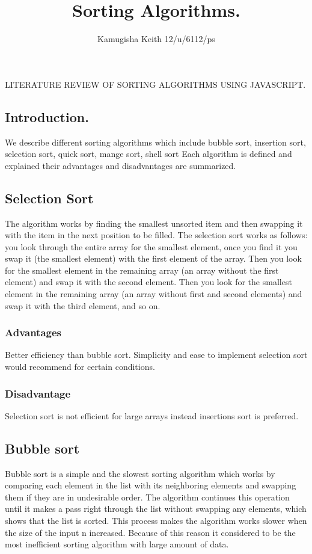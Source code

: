 \documentclass{article}
\title{Sorting Algorithms.}
\author{Kamugisha Keith 12/u/6112/ps}
\begin{document}
LITERATURE REVIEW OF SORTING ALGORITHMS USING JAVASCRIPT. 
\subsection{Introduction.}
	We describe different sorting algorithms which include bubble sort, insertion sort, selection sort, quick sort, mange sort, shell sort  Each algorithm is defined and explained their advantages and disadvantages are summarized.
	
\subsection{Selection Sort}
	The algorithm works by finding the smallest unsorted item and then swapping it with the item in the next position to be filled. The selection sort works as follows: you look through the entire array for the smallest element, once you find it you swap it (the smallest element) with the first element of the array. Then you look for the smallest element in the remaining array (an array without the first element) and swap it with the second element. Then you look for the smallest element in the remaining array (an array without first and second elements) and swap it with the third element, and so on.
\subsubsection{Advantages}
	Better efficiency than bubble sort. 
	Simplicity and ease to implement selection sort would recommend for certain conditions.
	
\subsubsection{Disadvantage}
	Selection sort is not efficient for large arrays instead insertions sort is preferred.



\subsection{Bubble sort}
	Bubble sort is a simple and the slowest sorting algorithm which works by comparing each element in the list with its neighboring elements and swapping them if they are in undesirable order. The algorithm continues this operation until it makes a pass right through the list without swapping any elements, which shows that the list is sorted. This process makes the algorithm works slower when the size of the input n increased. Because of this reason it considered to be the most inefficient sorting algorithm with large amount of data.
\end{document}
